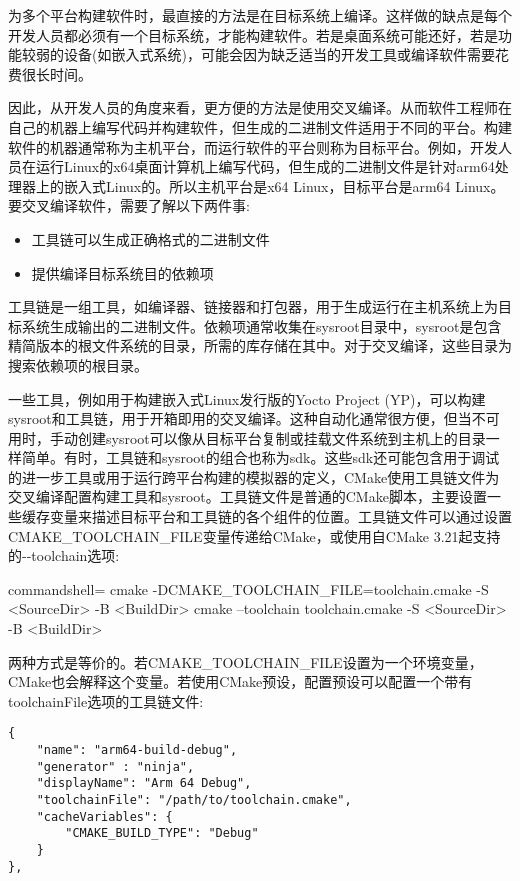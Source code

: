 为多个平台构建软件时，最直接的方法是在目标系统上编译。这样做的缺点是每个开发人员都必须有一个目标系统，才能构建软件。若是桌面系统可能还好，若是功能较弱的设备(如嵌入式系统)，可能会因为缺乏适当的开发工具或编译软件需要花费很长时间。

因此，从开发人员的角度来看，更方便的方法是使用交叉编译。从而软件工程师在自己的机器上编写代码并构建软件，但生成的二进制文件适用于不同的平台。构建软件的机器通常称为主机平台，而运行软件的平台则称为目标平台。例如，开发人员在运行Linux的x64桌面计算机上编写代码，但生成的二进制文件是针对arm64处理器上的嵌入式Linux的。所以主机平台是x64 Linux，目标平台是arm64 Linux。要交叉编译软件，需要了解以下两件事:

\begin{itemize}
\item 
工具链可以生成正确格式的二进制文件

\item 
提供编译目标系统目的依赖项
\end{itemize}

工具链是一组工具，如编译器、链接器和打包器，用于生成运行在主机系统上为目标系统生成输出的二进制文件。依赖项通常收集在sysroot目录中，sysroot是包含精简版本的根文件系统的目录，所需的库存储在其中。对于交叉编译，这些目录为搜索依赖项的根目录。

一些工具，例如用于构建嵌入式Linux发行版的Yocto Project (YP)，可以构建sysroot和工具链，用于开箱即用的交叉编译。这种自动化通常很方便，但当不可用时，手动创建sysroot可以像从目标平台复制或挂载文件系统到主机上的目录一样简单。有时，工具链和sysroot的组合也称为sdk。这些sdk还可能包含用于调试的进一步工具或用于运行跨平台构建的模拟器的定义，CMake使用工具链文件为交叉编译配置构建工具和sysroot。工具链文件是普通的CMake脚本，主要设置一些缓存变量来描述目标平台和工具链的各个组件的位置。工具链文件可以通过设置CMAKE\_TOOLCHAIN\_FILE变量传递给CMake，或使用自CMake 3.21起支持的-{}-toolchain选项:

\begin{tcblisting}{commandshell={}}
cmake -DCMAKE_TOOLCHAIN_FILE=toolchain.cmake -S <SourceDir> -B
  <BuildDir>
cmake --toolchain toolchain.cmake -S <SourceDir> -B <BuildDir>
\end{tcblisting}

两种方式是等价的。若CMAKE\_TOOLCHAIN\_FILE设置为一个环境变量，CMake也会解释这个变量。若使用CMake预设，配置预设可以配置一个带有toolchainFile选项的工具链文件:

\begin{lstlisting}[style=styleCMake]
{
	"name": "arm64-build-debug",
	"generator" : "ninja",
	"displayName": "Arm 64 Debug",
	"toolchainFile": "/path/to/toolchain.cmake",
	"cacheVariables": {
		"CMAKE_BUILD_TYPE": "Debug"
	}
},
\end{lstlisting}

